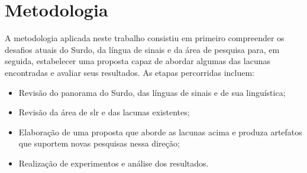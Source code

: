\section{Metodologia}
\label{sec:introducao-metodologia}

A metodologia aplicada neste trabalho consistiu em primeiro compreender os desafios atuais do Surdo, da língua de sinais e da área de pesquisa para, em seguida, estabelecer uma proposta capaz de abordar algumas das lacunas encontradas e avaliar seus resultados.
As etapas percorridas incluem:

\begin{itemize}
    \item Revisão do panorama do Surdo, das línguas de sinais e de sua linguística;
    \item Revisão da área de \acrlong{slr} e das lacunas existentes;
    \item Elaboração de uma proposta que aborde as lacunas acima e produza artefatos que suportem novas pesquisas nessa direção;
    \item Realização de experimentos e análise dos resultados.
\end{itemize}
